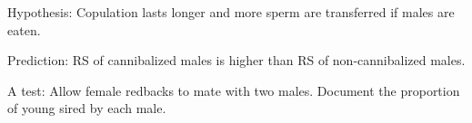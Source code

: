 \begin{frame}[t]
    \begin{adjustwidth}{-2em}{-1.5em}
        Hypothesis: Copulation lasts longer and more sperm are transferred if
        males are eaten. 

        \vspace{4mm}
        Prediction: RS of cannibalized males is higher than RS of
        non-cannibalized males.

        \vspace{4mm}
        A test: Allow female redbacks to mate with two males.  Document the
        proportion of young sired by each male. 
    \end{adjustwidth}
\end{frame}



\clickerslide{
\begin{frame}
    \begin{clickerquestion}
        \item 
        \begin{clickeroptions}
            \item 
            \item 
            \item 
            \item 
        \end{clickeroptions}
    \end{clickerquestion}
\end{frame}
}


